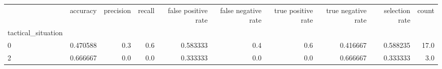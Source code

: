 \begin{tabular}{lrrrrrrrrr}
\toprule
{} &  accuracy &  precision &  recall &  false positive rate &  false negative rate &  true positive rate &  true negative rate &  selection rate &  count \\
tactical\_situation &           &            &         &                      &                      &                     &                     &                 &        \\
\midrule
0                  &  0.470588 &        0.3 &     0.6 &             0.583333 &                  0.4 &                 0.6 &            0.416667 &        0.588235 &   17.0 \\
2                  &  0.666667 &        0.0 &     0.0 &             0.333333 &                  0.0 &                 0.0 &            0.666667 &        0.333333 &    3.0 \\
\bottomrule
\end{tabular}
